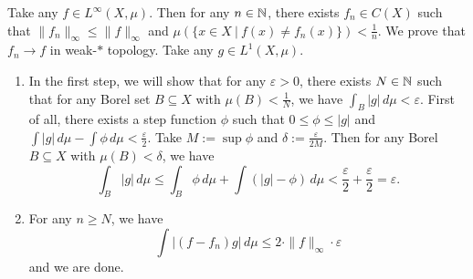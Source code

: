 \begin{myproof}
  Take any $f \in L^\infty (X, \mu)$. Then for any
  $n \in \mathbb {N}$, there exists $f_n \in C(X)$ such that $\| f_n \|_\infty \leq \| f\|_{\infty}$ and 
  $\mu (\{x \in X\ |\ f(x) \neq f_n(x)\}) < \frac{1}{n}$. We prove that $f_n  \to f$ in weak-$*$ topology.
  Take any $g \in L^1 (X, \mu)$. 
  \begin{enumerate}
    \item In the first step, we will show that for any $\varepsilon > 0$, there exists $N \in \mathbb {N}$ such that for any Borel set 
    $B \subseteq X$ with $\mu (B) < \frac{1}{N}$, we have $\int_B |g| \, d\mu < \varepsilon$.
    First of all, there exists a step function $\phi$ such that $0 \leq \phi \leq |g|$ and 
    $\int |g|\, d\mu - \int \phi\, d\mu < \frac{\varepsilon}{2}$. Take $M := \sup \phi$ 
    and $\delta := \frac{\varepsilon}{2M}$. Then for any Borel $B \subseteq X$ with $\mu (B)< \delta$, we have 
    $$\int_B |g|\, d\mu \leq \int_B \phi\, d\mu + \int (|g| - \phi)\, d\mu < \frac{\varepsilon}{2} + \frac{\varepsilon}{2} = \varepsilon.$$
    \item For any $n \geq N$, we have 
    $$\int |(f - f_n)g|\, d\mu \leq 2 \cdot \| f\|_\infty \cdot \varepsilon$$
    and we are done. \qedhere
  \end{enumerate}
\end{myproof}


